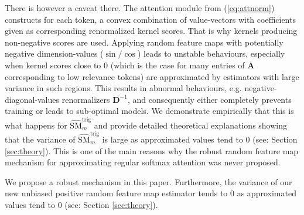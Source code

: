 There is however a caveat there. The attention module from (\ref{eq:attnorm}) constructs for each token, a convex combination of value-vectors with coefficients given as corresponding renormalized kernel scores. That is why kernels producing non-negative scores are used. Applying random feature maps with potentially negative dimension-values ($\sin/\cos$) leads to unstable behaviours, especially when kernel scores close to $0$ (which is the case for many %
entries of $\mathbf{A}$ corresponding to low relevance tokens) are approximated by estimators with large variance in such regions. This results in abnormal behaviours, e.g. negative-diagonal-values renormalizers $\mathbf{D}^{-1}$, and consequently either completely prevents training or leads to sub-optimal models. 
We demonstrate empirically that this is what happens for $\widehat{\mathrm{SM}}_{m}^{\mathrm{trig}}$ and provide detailed theoretical explanations showing that the variance of $\widehat{\mathrm{SM}}_{m}^{\mathrm{trig}}$ is large as approximated values tend to $0$ (see: Section \ref{sec:theory}). This is one of the main reasons why the robust random feature map mechanism for approximating regular softmax attention was never proposed.

We propose a robust mechanism in this paper. Furthermore, the variance of our new unbiased positive random feature map estimator tends to $0$ as approximated values tend to $0$ (see: Section \ref{sec:theory}).

